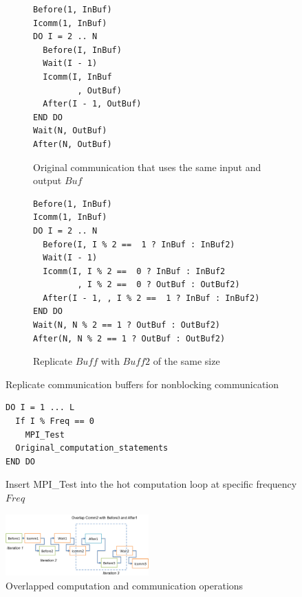\begin{figure}
{\scriptsize
  \centering
  \begin{subfigure}[b]{.20\textwidth}
\begin{verbatim}
Before(1, InBuf)
Icomm(1, InBuf)
DO I = 2 .. N
  Before(I, InBuf)
  Wait(I - 1)
  Icomm(I, InBuf
         , OutBuf)
  After(I - 1, OutBuf)
END DO
Wait(N, OutBuf)
After(N, OutBuf)
\end{verbatim}
    \caption{Original communication that uses the same input and output $Buf$}
    \label{fig:cco:dup:a}
  \end{subfigure}%
  \hspace{.01in}
  \begin{subfigure}[b]{.28\textwidth}
\begin{verbatim}
Before(1, InBuf)
Icomm(1, InBuf)
DO I = 2 .. N
  Before(I, I % 2 ==  1 ? InBuf : InBuf2)
  Wait(I - 1)
  Icomm(I, I % 2 ==  0 ? InBuf : InBuf2
         , I % 2 ==  0 ? OutBuf : OutBuf2)
  After(I - 1, , I % 2 ==  1 ? InBuf : InBuf2)
END DO
Wait(N, N % 2 == 1 ? OutBuf : OutBuf2)
After(N, N % 2 == 1 ? OutBuf : OutBuf2)
\end{verbatim}
    \caption{Replicate $Buff$ with $Buff2$ of the same size}
    \label{fig:cco:dup:b}
  \end{subfigure}
\caption{Replicate communication buffers for nonblocking communication}
\label{fig:cco:dup}
}%
\end{figure}

\begin{figure}[h]
{\scriptsize
\begin{verbatim}
DO I = 1 ... L
  If I % Freq == 0
    MPI_Test
  Original_computation_statements
END DO
\end{verbatim}
}%
\caption{Insert MPI\_Test into the hot computation loop at specific frequency $Freq$}
\label{fig:cco:test}
\end{figure}

\begin{figure}[h]
\centering
\includegraphics[width=0.49\textwidth]{fig/ft_shift.png} %
\caption{Overlapped computation and communication operations}
\label{fig:cco:shift}
\end{figure}


